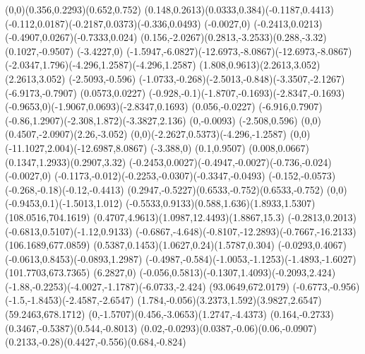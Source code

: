 {    \rcurveto(0,0)(0.356,0.2293)(0.652,0.752)
    \rcurveto(0.148,0.2613)(0.0333,0.384)(-0.1187,0.4413)
    \rcurveto(-0.112,0.0187)(-0.2187,0.0373)(-0.336,0.0493)
    \rlineto(-0.0027,0)
    \rcurveto(-0.2413,0.0213)(-0.4907,0.0267)(-0.7333,0.024)
    \rcurveto(0.156,-2.0267)(0.2813,-3.2533)(0.288,-3.32)
    \rlineto(0.1027,-0.9507)
    \rlineto(-3.4227,0)
    \rcurveto(-1.5947,-6.0827)(-12.6973,-8.0867)(-12.6973,-8.0867)
    \rcurveto(-2.0347,1.796)(-4.296,1.2587)(-4.296,1.2587)
    \rcurveto(1.808,0.9613)(2.2613,3.052)(2.2613,3.052)
    \rlineto(-2.5093,-0.596)
    \rcurveto(-1.0733,-0.268)(-2.5013,-0.848)(-3.3507,-2.1267)
    \rlineto(-6.9173,-0.7907)
    \rlineto(0.0573,0.0227)
    \rcurveto(-0.928,-0.1)(-1.8707,-0.1693)(-2.8347,-0.1693)
    \rcurveto(-0.9653,0)(-1.9067,0.0693)(-2.8347,0.1693)
    \rlineto(0.056,-0.0227)
    \rlineto(-6.916,0.7907)
    \rcurveto(-0.86,1.2907)(-2.308,1.872)(-3.3827,2.136)
    \rlineto(0,-0.0093)
    \rlineto(-2.508,0.596)
    \rcurveto(0,0)(0.4507,-2.0907)(2.26,-3.052)
    \rcurveto(0,0)(-2.2627,0.5373)(-4.296,-1.2587)
    \rcurveto(0,0)(-11.1027,2.004)(-12.6987,8.0867)
    \rlineto(-3.388,0)
    \rlineto(0.1,0.9507)
    \rcurveto(0.008,0.0667)(0.1347,1.2933)(0.2907,3.32)
    \rcurveto(-0.2453,0.0027)(-0.4947,-0.0027)(-0.736,-0.024)
    \rlineto(-0.0027,0)
    \rcurveto(-0.1173,-0.012)(-0.2253,-0.0307)(-0.3347,-0.0493)
    \rcurveto(-0.152,-0.0573)(-0.268,-0.18)(-0.12,-0.4413)
    \rcurveto(0.2947,-0.5227)(0.6533,-0.752)(0.6533,-0.752)
    \rcurveto(0,0)(-0.9453,0.1)(-1.5013,1.012)
    \rcurveto(-0.5533,0.9133)(0.588,1.636)(1.8933,1.5307)
    \moveto(108.0516,704.1619)
    \rcurveto(0.4707,4.9613)(1.0987,12.4493)(1.8867,15.3)
    \rcurveto(-0.2813,0.2013)(-0.6813,0.5107)(-1.12,0.9133)
    \rcurveto(-0.6867,-4.648)(-0.8107,-12.2893)(-0.7667,-16.2133)
    \moveto(106.1689,677.0859)
    \rcurveto(0.5387,0.1453)(1.0627,0.24)(1.5787,0.304)
    \rcurveto(-0.0293,0.4067)(-0.0613,0.8453)(-0.0893,1.2987)
    \rcurveto(-0.4987,-0.584)(-1.0053,-1.1253)(-1.4893,-1.6027)
    \moveto(101.7703,673.7365)
    \rlineto(6.2827,0)
    \rcurveto(-0.056,0.5813)(-0.1307,1.4093)(-0.2093,2.424)
    \rcurveto(-1.88,-0.2253)(-4.0027,-1.1787)(-6.0733,-2.424)
    \moveto(93.0649,672.0179)
    \rcurveto(-0.6773,-0.956)(-1.5,-1.8453)(-2.4587,-2.6547)
    \rcurveto(1.784,-0.056)(3.2373,1.592)(3.9827,2.6547)
    \closepath
    \moveto(59.2463,678.1712)
    \rcurveto(0,-1.5707)(0.456,-3.0653)(1.2747,-4.4373)
    \rcurveto(0.164,-0.2733)(0.3467,-0.5387)(0.544,-0.8013)
    \rcurveto(0.02,-0.0293)(0.0387,-0.06)(0.06,-0.0907)
    \rcurveto(0.2133,-0.28)(0.4427,-0.556)(0.684,-0.824)
}
